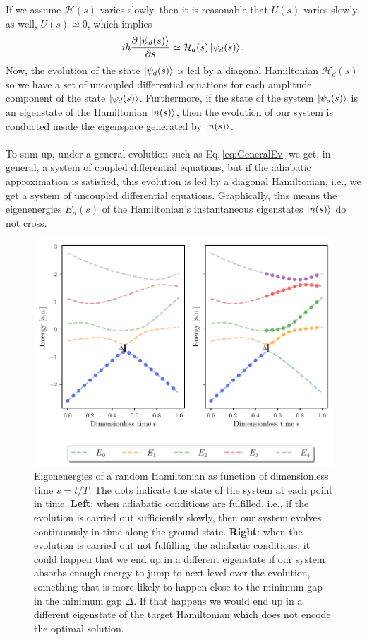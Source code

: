 If we assume $\mathcal{H}(s)$ varies slowly, then it is reasonable that $U(s)$ varies slowly as well, $\dot{U}(s) \simeq 0$, which implies
\begin{equation}
    i\hbar  \frac{\partial \ket{\psi_{d}(s)}}{\partial s} \simeq \mathcal{H}_{d}(s)\ket{\psi_{d}(s)}.
\end{equation}
Now, the evolution of the state $\ket{\psi_{d}(s)}$ is led by a diagonal Hamiltonian $\mathcal{H}_{d}(s)$ so we have a set of uncoupled differential equations for each amplitude component of the state $\ket{\psi_{d}(s)}$. Furthermore, if the state of the system $\ket{\psi_{d}(s)}$ is an eigenstate of the Hamiltonian $\ket{n(s)}$, then the evolution of our system is conducted inside the eigenspace generated by $\ket{n(s)}$.\\\\
To sum up, under a general evolution such as Eq.\,\eqref{eq:GeneralEv} we get, in general, a system of coupled differential equations, but if the adiabatic approximation is satisfied, this evolution is led by a diagonal Hamiltonian, i.e., we get a system of uncoupled differential equations. Graphically, this means the eigenenergies $E_{n}(s)$ of the Hamiltonian's instantaneous eigenstates $\ket{n(s)}$ do not cross.
\begin{figure}[H]
\centering
\includegraphics[width=\textwidth]{Figures/Eigenenergies.pdf}
    \caption{Eigenenergies of a random Hamiltonian as function of dimensionless time $s=t/T$. The dots indicate the state of the system at each point in time. \textbf{Left}: when adiabatic conditions are fulfilled, i.e., if the evolution is carried out sufficiently slowly, then our system evolves continuously in time along the ground state. \textbf{Right}: when the evolution is carried out not fulfilling the adiabatic conditions, it could happen that we end up in a different eigenstate if our system absorbs enough energy to jump to next level over the evolution, something that is more likely to happen close to the minimum gap in the minimum gap $\Delta$. If that happens we would end up in a different eigenstate of the target Hamiltonian which does not encode the optimal solution.}
    \label{fig:Eigenenergies}
\end{figure}
